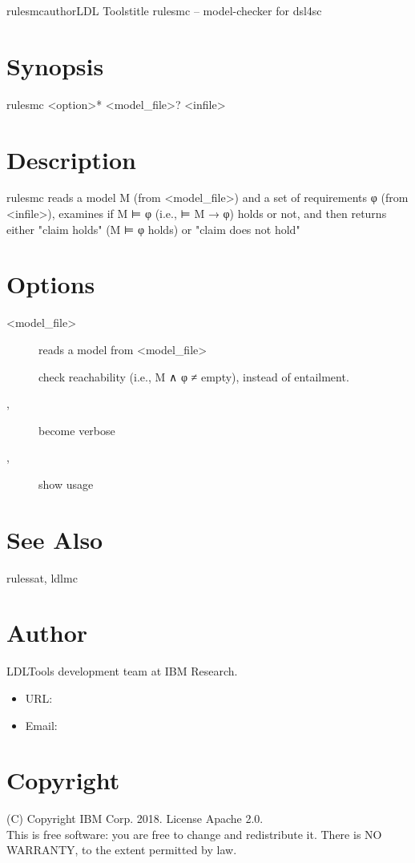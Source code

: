 \documentclass[fancy]{article}
\begin{document}
\begin{Name}{1}{rulesmc}{author}{LDL Tools}{title}
rulesmc -- model-checker for dsl4sc
\end{Name}

\section{Synopsis}
rulesmc <option>* <model_file>? <infile>

\section{Description}
rulesmc reads a model M (from <model_file>) and a set of requirements φ (from <infile>),
examines if M ⊨ φ (i.e., ⊨ M → φ) holds or not, and then
returns either "claim holds" (M ⊨ φ holds) or "claim does not hold" 

\section{Options}
\begin{description}
%
\item[ <model_file>]
reads a model from <model_file>
%
\item[]
check reachability (i.e., M ∧ φ ≠ empty), instead of entailment.
%
\item[, ]
become verbose
%
\item[, ]
show usage
\end{description}

\section{See Also}
rulessat, ldlmc

\section{Author}
LDLTools development team at IBM Research.

\begin{itemize}
\item URL: 
\item Email: 
\end{itemize}

\section{Copyright}
(C) Copyright IBM Corp. 2018.
License Apache 2.0.\\

This is free software: you are free to change and redistribute it.
There is NO  WARRANTY,  to the extent permitted by law.
\end{document}
